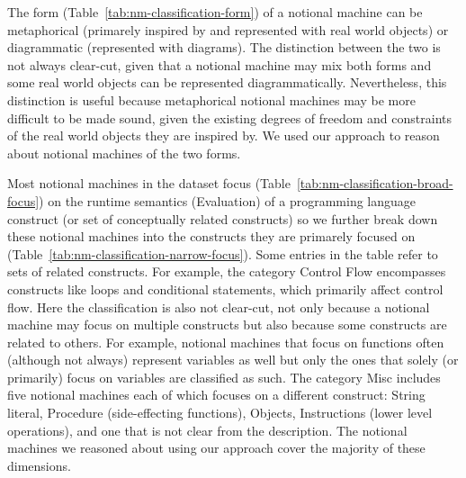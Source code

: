 %
The form (Table~\ref{tab:nm-classification-form}) of
a notional machine
can be
metaphorical (primarely inspired by and represented with real world objects) or
diagrammatic (represented with diagrams).
The distinction between the two is not always clear-cut,
given that
a notional machine may mix both forms
and
some real world objects can be represented diagrammatically.
%
Nevertheless, this distinction is useful because metaphorical notional machines may be more difficult to be made sound, given the existing degrees of freedom and constraints of the real world objects they are inspired by.
%
We used our approach to reason about notional machines of the two forms.


Most notional machines in the dataset focus (Table~\ref{tab:nm-classification-broad-focus})
on the runtime semantics (Evaluation) of a programming language construct
(or set of conceptually related constructs)
so
%
we further
break down these notional machines into the constructs they are primarely focused on (Table~\ref{tab:nm-classification-narrow-focus}).
%
Some entries in the table refer to sets of related constructs.
For example,
the category Control Flow encompasses constructs like loops and conditional statements, which primarily affect control flow.
%
%
%
Here the classification is also not clear-cut,
not only because a notional machine may focus on multiple constructs
but also because some constructs are related to others.
For example,
notional machines that focus on functions often (although not always) represent variables as well
but only the ones that solely (or primarily) focus on variables are classified as such.
%
The category Misc
includes five notional machines each of which focuses on a different construct:
String literal,
Procedure (side-effecting functions),
Objects,
Instructions (lower level operations),
and
one that is not clear from the description.
%
The notional machines we reasoned about using our approach cover the majority of these dimensions.


